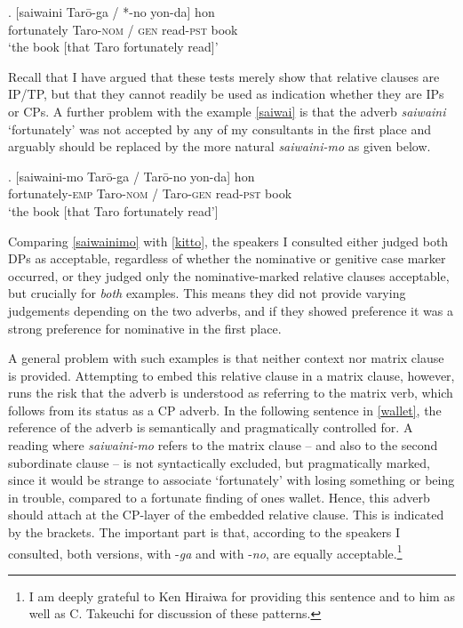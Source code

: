 \exg. [saiwaini Tarō-ga / *-no yon-da] hon\\
fortunately Taro-\textsc{nom} / \textsc{gen} read-\textsc{pst} book\\
`the book [that Taro fortunately read]’ \null \hfill \citep[1273]{miyagawa:2011:genitive} \label{saiwai}

Recall that I have argued that these tests merely show that relative clauses are IP/TP, but that they cannot readily be used as indication whether they are IPs or CPs. A further problem with the example \ref{saiwai} is that the adverb \textit{saiwaini} `fortunately' was not accepted by any of my consultants in the first place and arguably should be replaced by the more natural \textit{saiwaini-mo} as given below.

\exg. [saiwaini-mo Tarō-ga / Tarō-no yon-da] hon\\
fortunately-\textsc{emp} Taro-\textsc{nom} / Taro-\textsc{gen} read-\textsc{pst} book\\
`the book [that Taro fortunately read’] \label{saiwainimo}

Comparing \ref{saiwainimo} with \ref{kitto}, the speakers I consulted either judged both DPs as acceptable, regardless of whether the nominative or genitive case marker occurred, or they judged only the nominative-marked relative clauses acceptable, but crucially for \textit{both} examples. This means they did not provide varying judgements depending on the two adverbs, and if they showed preference it was a strong preference for nominative in the first place.

A general problem with such examples is that neither context nor matrix clause is provided. Attempting to embed this relative clause in a matrix clause, however, runs the risk that the adverb is understood as referring to the matrix verb, which follows from its status as a CP adverb. In the following sentence in \ref{wallet}, the reference of the adverb is semantically and pragmatically controlled for. A reading where \textit{saiwaini-mo} refers to the matrix clause -- and also to the second subordinate clause -- is not syntactically excluded, but pragmatically marked, since it would be strange to associate `fortunately' with losing something or being in trouble, compared to a fortunate finding of ones wallet. Hence, this adverb should attach at the CP-layer of the embedded relative clause. This is indicated by the brackets. The important part is that, according to the speakers I consulted, both versions, with -\textit{ga} and with -\textit{no}, are equally acceptable.\footnote{I am deeply grateful to Ken Hiraiwa for providing this sentence and to him as well as C. Takeuchi for discussion of these patterns.}

